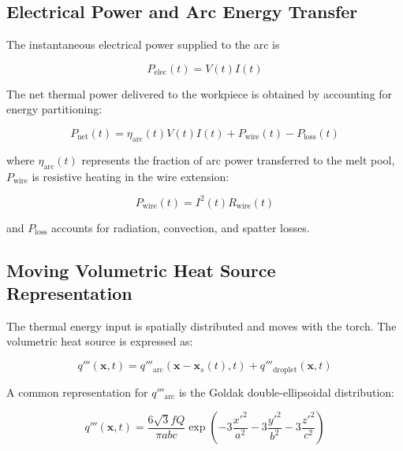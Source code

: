 \documentclass[conference]{IEEEtran}
\begin{document}
\subsection{Electrical Power and Arc Energy Transfer}

The instantaneous electrical power supplied to the arc is

\begin{equation}
P_{\mathrm{elec}}(t) = V(t) I(t)
\label{eq:elec_power}
\end{equation}

The net thermal power delivered to the workpiece is obtained by accounting for energy partitioning:

\begin{equation}
P_{\mathrm{net}}(t)
=
\eta_{\mathrm{arc}}(t) V(t) I(t)
+
P_{\mathrm{wire}}(t)
-
P_{\mathrm{loss}}(t)
\label{eq:net_power}
\end{equation}

where $\eta_{\mathrm{arc}}(t)$ represents the fraction of arc power transferred to the melt pool, $P_{\mathrm{wire}}$ is resistive heating in the wire extension:

\begin{equation}
P_{\mathrm{wire}}(t) = I^2(t) R_{\mathrm{wire}}(t)
\end{equation}

and $P_{\mathrm{loss}}$ accounts for radiation, convection, and spatter losses.

\subsection{Moving Volumetric Heat Source Representation}

The thermal energy input is spatially distributed and moves with the torch. The volumetric heat source is expressed as:

\begin{equation}
q'''(\mathbf{x},t)
=
q'''_{\mathrm{arc}}(\mathbf{x}-\mathbf{x}_s(t),t)
+
q'''_{\mathrm{droplet}}(\mathbf{x},t)
\label{eq:q_total}
\end{equation}

A common representation for $q'''_{\mathrm{arc}}$ is the Goldak double-ellipsoidal distribution:

\begin{equation}
q'''(\mathbf{x},t)
=
\frac{6 \sqrt{3} f Q}{\pi a b c}
\exp\left(-3\frac{x'^2}{a^2}-3\frac{y'^2}{b^2}-3\frac{z'^2}{c^2}\right)
\end{equation}
\end{document}
